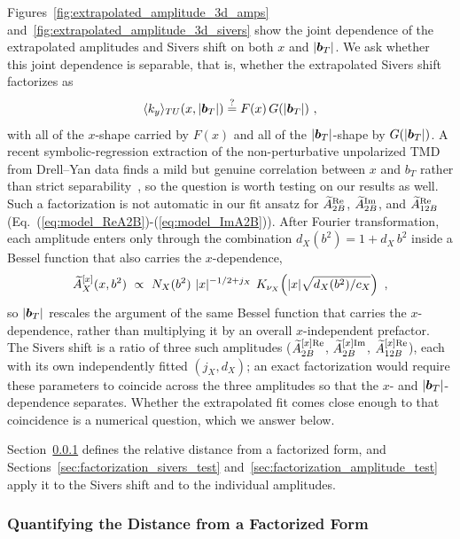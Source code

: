 Figures~\ref{fig:extrapolated_amplitude_3d_amps} and~\ref{fig:extrapolated_amplitude_3d_sivers} show the joint dependence of the extrapolated amplitudes and Sivers shift on both $x$ and $|\boldsymbol{b}_T|$. We ask whether this joint dependence is separable, that is, whether the extrapolated Sivers shift factorizes as
\begin{equation}
    \langle k_y \rangle_{TU}(x,|\vect{b}_T|) \overset{?}{=} F(x)\,G(|\vect{b}_T|) \ ,
\end{equation}
with all of the $x$-shape carried by $F(x)$ and all of the $|\boldsymbol{b}_T|$-shape by $G(|\boldsymbol{b}_T|)$. A recent symbolic-regression extraction of the non-perturbative unpolarized TMD from Drell--Yan data finds a mild but genuine correlation between $x$ and $b_T$ rather than strict separability~\cite{Granger:2026symb}, so the question is worth testing on our results as well. Such a factorization is not automatic in our fit ansatz for $\widetilde{A}_{2B}^{\text{Re}}$, $\widetilde{A}_{2B}^{\text{Im}}$, and $\widetilde{A}_{12B}^{\text{Re}}$ (Eq.~(\ref{eq:model_ReA2B})-(\ref{eq:model_ImA2B})). After Fourier transformation, each amplitude enters only through the combination $d_X(b^2) = 1 + d_X\,b^2$ inside a Bessel function that also carries the $x$-dependence,
\begin{equation}
    \tAmp^{[x]}_X(x,b^2) \ \propto\ N_X(b^2)\ |x|^{-1/2+j_X}\ K_{\nu_X}\!\left(|x|\sqrt{d_X(b^2)/c_X}\right) \ ,
\end{equation}
so $|\boldsymbol{b}_T|$ rescales the argument of the same Bessel function that carries the $x$-dependence, rather than multiplying it by an overall $x$-independent prefactor. The Sivers shift is a ratio of three such amplitudes ($\widetilde{A}^{[x]\text{Re}}_{2B}$, $\widetilde{A}^{[x]\text{Im}}_{2B}$, $\widetilde{A}^{[x]\text{Re}}_{12B}$), each with its own independently fitted $(j_X,d_X)$; an exact factorization would require these parameters to coincide across the three amplitudes so that the $x$- and $|\boldsymbol{b}_T|$-dependence separates. Whether the extrapolated fit comes close enough to that coincidence is a numerical question, which we answer below.

Section~\ref{sec:factorization_metric} defines the relative distance from a factorized form, and Sections~\ref{sec:factorization_sivers_test} and~\ref{sec:factorization_amplitude_test} apply it to the Sivers shift and to the individual amplitudes.

\subsubsection{Quantifying the Distance from a Factorized Form}
\label{sec:factorization_metric}

